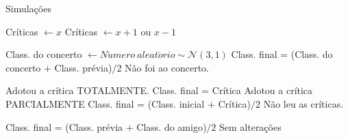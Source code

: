 \documentclass[a4paper, 12pt, openright, oneside, german, french, english, brazil]{abntex2}
\begin{document}
	
	
	
	\begin{algorithm}
		\caption{Simulações}\label{sim-geral}
		\begin{algorithmic}[1]
			
			 
			\State Críticas $\gets x$
			\Else			   {}
			\State Críticas $\gets x+1$ ou $x-1$
			\EndIf
			\State {}
			\State {}
			\State {}
			\EndWhile
			\EndFunction
			
			
			\State Class. do concerto $\gets N\acute{u}mero\ aleat\acute{o}rio \sim \mathcal{N}(3,1)$
			\State Class. final = (Class. do concerto $+$ Class. prévia)$/2$
			\Else
			\State Não foi ao concerto.
			\EndIf
			\EndFunction
			
			\State Adotou a crítica TOTALMENTE.
			\State Class. final = Crítica
			\Else
			\State Adotou a crítica PARCIALMENTE
			\State Class. final = (Class. inicial $+$ Crítica)$/2$
			\EndIf
			\Else
			\State Não leu as críticas.
			\EndIf
			\EndFunction
			
			\State Class. final = (Class. prévia $+$ Class. do amigo)$/2$
			\Else
			\State Sem alterações
			\EndIf
			\EndFor
			\EndFunction	
		\end{algorithmic}
	\end{algorithm}
	
	
	
	
	
	
	
	
	
	
	
	
	
	
	
	
\end{document}
